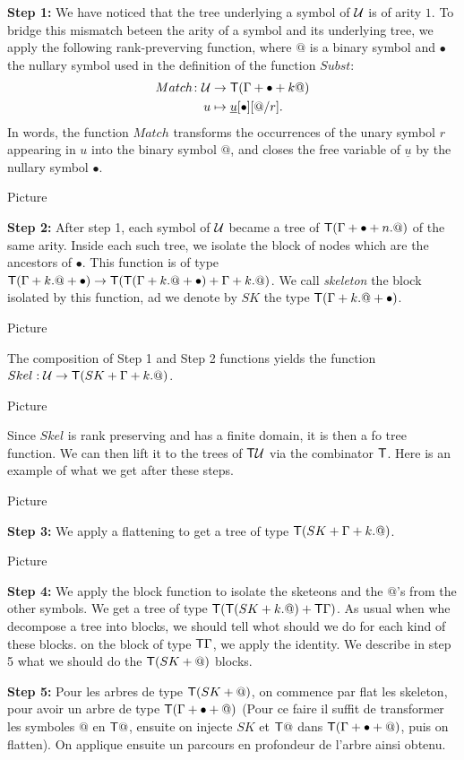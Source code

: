 \medskip
\noindent\textbf{Step 1:} We have noticed that the tree underlying a symbol of ${\mathcal U}$ is of arity $1$. To bridge this mismatch beteen the arity of a symbol and its underlying tree, we apply the following
rank-preverving function, where $@$ is a binary symbol and $\bullet$ the nullary symbol used in the definition of the function $Subst$:
 \begin{align*}
  Match\colon {\mathcal U} &\to \mathsf T(\Gamma+\bullet+k@)\\
  u &\mapsto \underline{u}[\bullet][@/r].
\end{align*} 
In words, the function $Match$ transforms the occurrences of the unary symbol $r$ appearing in $u$ into the binary symbol $@$, and closes the free variable of $\underline{u}$ by the nullary symbol $\bullet$.
\begin{center}
Picture
\end{center}
\medskip
\textbf{Step 2:} After step 1, each symbol of ${\mathcal U}$ became a tree of $\mathsf T(\Gamma+\bullet+n.@)$ of the same arity. Inside each such tree, we isolate the block of nodes which are the ancestors of $\bullet$. This function is of type $\mathsf T(\Gamma+k.@+\bullet)\to \mathsf T (\mathsf T (\Gamma+k.@+\bullet)+\Gamma+k.@)$. We call \emph{skeleton} the block isolated by this function, ad we denote by 
$SK$ the type $\mathsf T (\Gamma+k.@+\bullet)$.
\begin{center}
Picture
\end{center}
The composition of Step 1 and Step 2 functions yields the function $Skel:{\mathcal U}\to \mathsf T (SK+\Gamma+k.@)$. 
\begin{center}
Picture
\end{center}
Since $Skel$ is rank preserving and has a finite domain, it is then a fo tree function. We can then lift it to the trees of $\mathsf T {\mathcal U}$ via the combinator $\mathsf T$. Here is an example of what we get after these steps.
\begin{center}
Picture
\end{center}
 \medskip
\textbf{Step 3:} We apply a flattening to get a tree of type $\mathsf T(SK+\Gamma+k.@)$. 
\begin{center}
Picture
\end{center}
\medskip
\textbf{Step 4:} We apply the block function to isolate the sketeons and the $@$'s from the other symbols. We get a tree of type $\mathsf T (\mathsf T(SK+k.@)+\mathsf T\Gamma)$. As usual when whe decompose a tree into blocks, we should tell whot should we do for each kind of these blocks. on the block of type $\mathsf T \Gamma$, we apply the identity. We describe in step 5 what we should do the $\mathsf T(SK+@)$ blocks.

\medskip
\noindent \textbf{Step 5:} Pour les arbres de type $\mathsf T (SK+@)$, on commence par flat les skeleton, pour avoir un arbre de type $\mathsf T(\Gamma+\bullet+@)$ (Pour ce faire il suffit de transformer les symboles $@$ en $\mathsf T @$, ensuite on injecte $SK$ et $\mathsf T @$ dans $\mathsf T(\Gamma+\bullet+@)$, puis on flatten).
On applique ensuite un parcours en profondeur de l'arbre ainsi obtenu.
 

